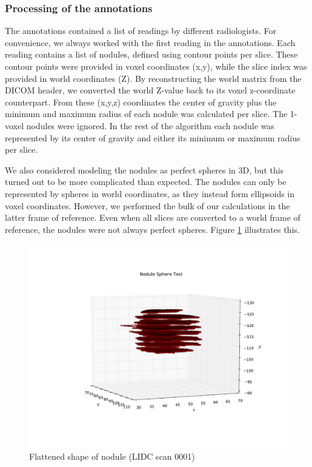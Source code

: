 \subsubsection{Processing of the annotations}
The annotations contained a list of readings by different radiologists. For
convenience, we always worked with the first reading in the annotations. Each
reading contains a list of nodules, defined using contour points per slice.
These contour points were provided in voxel coordinates (x,y), while the slice
index was provided in world coordinates (Z). By reconstructing the world matrix
from the DICOM header, we converted the world Z-value back to its voxel
z-coordinate counterpart. From these (x,y,z) coordinates the center of gravity
plus the minimum and maximum radius of each nodule was calculated per slice. The
1-voxel nodules were ignored. In the rest of the algorithm each nodule was
represented by its center of gravity and either its minimum or maximum radius
per slice.

We also considered modeling the nodules as perfect spheres in 3D, but this
turned out to be more complicated than expected. The nodules can only be
represented by spheres in world coordinates, as they instead form ellipsoids in
voxel coordinates. However, we performed the bulk of our calculations in the
latter frame of reference. Even when all slices are converted to a world frame
of reference, the nodules were not always perfect spheres. Figure
\ref{fig:flatNodule} illustrates this.

\begin{figure}[ht]
 \begin{center}
    \includegraphics[width=\linewidth, trim=150 0 0 0]{img/NoduleSphereTest_0001.pdf}
    \caption{Flattened shape of nodule (LIDC scan 0001)}
    \label{fig:flatNodule}
 \end{center}
\end{figure}

